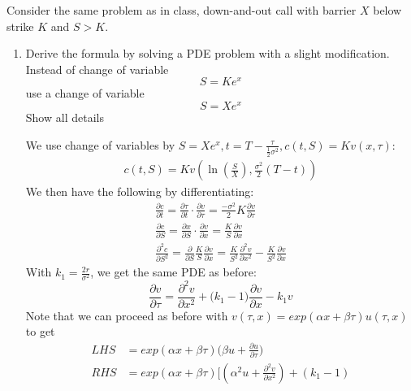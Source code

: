 \documentclass[12pt,twoside, letter]{exam}
\theoremstyle{definition}
\begin{document}
\par{Consider the same problem as in class, down-and-out call with barrier $X$ below strike $K$ and $S > K$.}

\begin{enumerate}
  \item Derive the formula by solving a PDE problem with a slight modification. Instead of change of variable
    \begin{equation*}
      S = Ke^{x}
    \end{equation*}
    use a change of variable
    \begin{equation*}
      S = Xe^{x}
    \end{equation*}
    Show all details
    \begin{solution}
      We use change of variables by $S = Xe^x, t = T - \frac{\tau}{\frac{1}{2}\sigma^2}, c(t,S) = Kv(x, \tau)$:
      \begin{align*}
        c(t,S) = Kv(\ln(\frac{S}{X}), \frac{\sigma^2}{2}(T-t))
      \end{align*}
      We then have the following by differentiating:
      \begin{align*}
        \frac{\partial c}{\partial t} = \frac{\partial \tau}{\partial t} \cdot \frac{\partial v}{\partial \tau}
        = \frac{-\sigma^2}{2}K \frac{\partial v}{\partial \tau} \\
        \frac{\partial c}{\partial S} = \frac{\partial x}{\partial S} \cdot \frac{\partial v}{\partial x}
        = \frac{K}{S} \frac{\partial v}{\partial x} \\
        \frac{\partial^2 c}{\partial S^2} = \frac{\partial}{\partial S} \frac{K}{S} \frac{\partial v}{\partial x}
        = \frac{K}{S^2}\frac{\partial^2 v}{\partial x^2} - \frac{K}{S^2} \frac{\partial v}{\partial x}
      \end{align*}
      With $k_1 = \frac{2r}{\sigma^2}$, we get the same PDE as before:
      \begin{equation*}
      \frac{\partial v}{\partial \tau} = \frac{\partial^2 v}{\partial x^2}
      + \bigg(k_1 - 1\bigg)\frac{\partial v}{\partial x} - k_1v
      \end{equation*}
      Note that we can proceed as before with $v(\tau, x) = exp(\alpha x + \beta \tau)u(\tau, x)$ to get
      \begin{align*}
        LHS &= exp(\alpha x + \beta \tau)\bigg(\beta u + \frac{\partial u}{\partial \tau} \bigg) \\
        RHS &= exp(\alpha x + \beta \tau)\bigg[(\alpha^2u + \frac{\partial^2 v}{\partial x^2}) + (k_1 - 1)

\end{align*}
\end{solution}
\end{enumerate}
\end{document}
